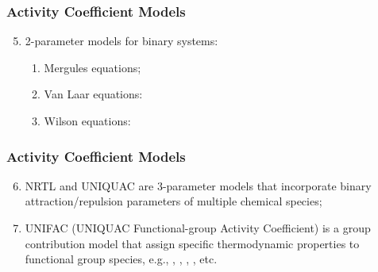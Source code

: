 \documentclass[10pt,compress,handout,ignorenonframetext,unknownkeysallowed]{beamer}
\begin{document}
\begin{frame}
  \frametitle{Activity Coefficient Models}
  \begin{enumerate}\setcounter{enumi}{4}
      \item<1-> 2-parameter models for binary systems:
        \begin{enumerate}
          \item<1-> Mergules equations;
          \item<2-> Van Laar equations:
          \item<3-> Wilson equations:
        \end{enumerate} 
  \end{enumerate}
\end{frame}
\normalsize


\begin{frame}
  \frametitle{Activity Coefficient Models}
  \begin{enumerate}\setcounter{enumi}{5}
      \item<1-> NRTL and UNIQUAC are 3-parameter models that incorporate binary attraction/repulsion parameters of multiple chemical species;
       \item<2-> UNIFAC (UNIQUAC Functional-group Activity Coefficient) is a group contribution model that assign specific thermodynamic properties to functional group species, e.g., , , , , etc.
  \end{enumerate}
\end{frame}
\normalsize
\end{document}
